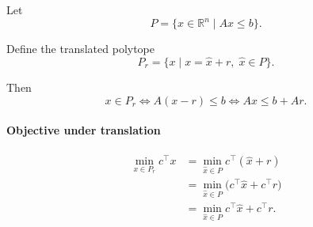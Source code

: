 \documentclass{article}
\begin{document}
Let
\[
P = \{x \in \mathbb{R}^n \mid Ax \le b\}.
\]

Define the translated polytope
\[
P_r = \{x \mid x = \hat{x} + r,\; \hat{x} \in P\}.
\]

Then
\[
x \in P_r
\iff A(x-r) \le b
\iff Ax \le b + Ar .
\]

\paragraph{Objective under translation}
\[
\begin{aligned}
\min_{x \in P_r} c^\top x
&= \min_{\hat{x} \in P} c^\top (\hat{x} + r) \\
&= \min_{\hat{x} \in P} \big(c^\top \hat{x} + c^\top r\big) \\
&= \min_{\hat{x} \in P} c^\top \hat{x} + c^\top r .
\end{aligned}
\]
\end{document}
